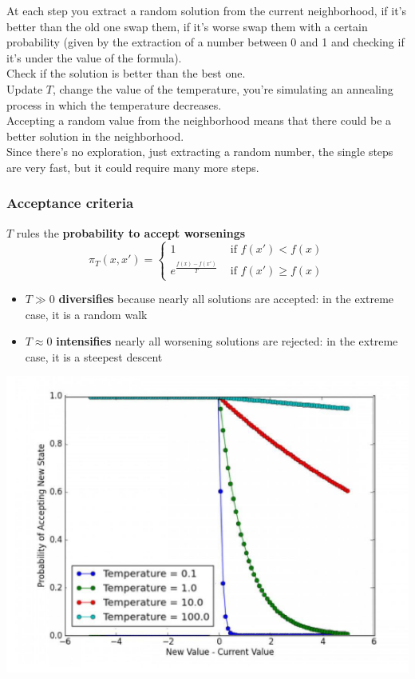 At each step you extract a random solution from the current neighborhood, if it's better than the old one swap them, if it's worse swap them with a certain probability (given by the extraction of a number between 0 and 1 and checking if it's under the value of the formula).\\
Check if the solution is better than the best one.\\
Update $T$, change the value of the temperature, you're simulating an annealing process in which the temperature decreases.\\

Accepting a random value from the neighborhood means that there could be a better solution in the neighborhood.\\
Since there's no exploration, just extracting a random number, the single steps are very fast, but it could require many more steps.

\newpage

\subsubsection{Acceptance criteria}
$T$ rules the \textbf{probability to accept worsenings}
$$ \pi_T (x, x') = \begin{cases}
	1 & \text{ if } f(x') < f(x) \\
	e^{\frac{f(x) - f(x')}{T}} & \text{ if } f(x') \geq f(x)
\end{cases}$$

\begin{itemize}
	\item $T \gg 0$ \textbf{diversifies} because nearly all solutions are accepted: in the extreme case, it is a random walk
	
	\item $T \approx 0$ \textbf{intensifies} nearly all worsening solutions are rejected: in the extreme case, it is a steepest descent
	
\end{itemize}

\begin{center}
	\includegraphics[width=0.6\columnwidth]{img/temp1}
\end{center}


